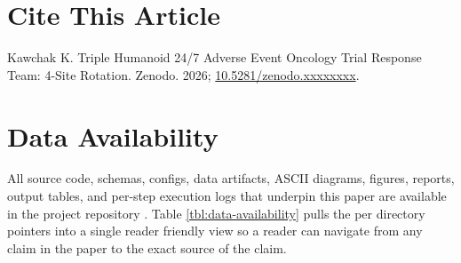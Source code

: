 {}
\section*{Cite This Article}

Kawchak K. Triple Humanoid 24/7 Adverse Event Oncology Trial
Response Team: 4-Site Rotation. Zenodo. 2026;
\href{https://doi.org/10.5281/zenodo.xxxxxxxx}{10.5281/zenodo.xxxxxxxx}.

{}
\section*{Data Availability}

All source code, schemas, configs, data artifacts, ASCII diagrams,
figures, reports, output tables, and per-step execution logs that
underpin this paper are available in the project repository
\cite{kawchak_2026_clinical_ai_demos_repo}. Table
\ref{tbl:data-availability} pulls the per directory pointers into a
single reader friendly view so a reader can navigate from any claim
in the paper to the exact source of the claim.

